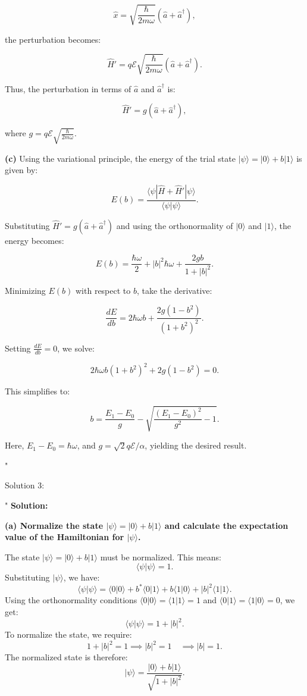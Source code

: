 \[
\hat{x} = \sqrt{\frac{\hbar}{2m\omega}} (\hat{a} + \hat{a}^\dagger),
\]

the perturbation becomes:

\[
\hat{H}' = q \mathcal{E} \sqrt{\frac{\hbar}{2m\omega}} (\hat{a} + \hat{a}^\dagger).
\]

Thus, the perturbation in terms of \(\hat{a}\) and \(\hat{a}^\dagger\) is:

\[
\hat{H}' = g (\hat{a} + \hat{a}^\dagger),
\]

where \(g = q \mathcal{E} \sqrt{\frac{\hbar}{2m\omega}}\).

\textbf{(c)} Using the variational principle, the energy of the trial state \(|\psi\rangle = |0\rangle + b|1\rangle\) is given by:

\[
E(b) = \frac{\langle \psi | \hat{H} + \hat{H}' | \psi \rangle}{\langle \psi | \psi \rangle}.
\]

Substituting \(\hat{H}' = g (\hat{a} + \hat{a}^\dagger)\) and using the orthonormality of \(|0\rangle\) and \(|1\rangle\), the energy becomes:

\[
E(b) = \frac{\hbar \omega}{2} + |b|^2 \hbar \omega + \frac{2 g b}{1 + |b|^2}.
\]

Minimizing \(E(b)\) with respect to \(b\), take the derivative:

\[
\frac{dE}{db} = 2 \hbar \omega b + \frac{2g(1 - b^2)}{(1 + b^2)^2}.
\]

Setting \(\frac{dE}{db} = 0\), we solve:

\[
2 \hbar \omega b (1 + b^2)^2 + 2g(1 - b^2) = 0.
\]

This simplifies to:

\[
b = \frac{E_1 - E_0}{g} - \sqrt{\frac{(E_1 - E_0)^2}{g^2} - 1}.
\]

Here, \(E_1 - E_0 = \hbar \omega\), and \(g = \sqrt{2} q \mathcal{E}/\alpha\), yielding the desired result.

"

Solution 3:

"
\textbf{Solution:}

\textbf{(a) Normalize the state \(|\psi\rangle = |0\rangle + b |1\rangle\) and calculate the expectation value of the Hamiltonian for \(|\psi\rangle\).}

The state \(|\psi\rangle = |0\rangle + b |1\rangle\) must be normalized. This means:
\[
\langle \psi | \psi \rangle = 1.
\]
Substituting \(|\psi\rangle\), we have:
\[
\langle \psi | \psi \rangle = \langle 0 | 0 \rangle + b^* \langle 0 | 1 \rangle + b \langle 1 | 0 \rangle + |b|^2 \langle 1 | 1 \rangle.
\]
Using the orthonormality conditions \(\langle 0 | 0 \rangle = \langle 1 | 1 \rangle = 1\) and \(\langle 0 | 1 \rangle = \langle 1 | 0 \rangle = 0\), we get:
\[
\langle \psi | \psi \rangle = 1 + |b|^2.
\]
To normalize the state, we require:
\[
1 + |b|^2 = 1 \implies |b|^2 = 1 \quad \implies |b| = 1.
\]
The normalized state is therefore:
\[
|\psi\rangle = \frac{|0\rangle + b |1\rangle}{\sqrt{1 + |b|^2}}.
\]

